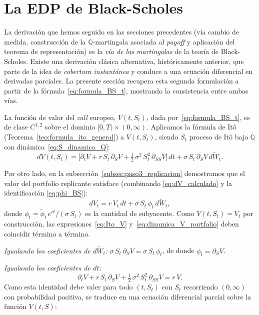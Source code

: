 \documentclass[11pt,a4paper,oneside]{report}
\theoremstyle{plain}
\theoremstyle{definition}
\theoremstyle{remark}
\newcommand{\Q}{\mathbb{Q}}
\newcommand{\1}{\mathbf{1}}
\begin{document}
\section{La EDP de Black-Scholes}
\label{sec:edp_bs}

La derivación que hemos seguido en las secciones precedentes (vía
cambio de medida, construcción de la $\Q$-martingala asociada al
\emph{payoff} y aplicación del teorema de representación) es la \emph{vía
de las martingalas} de la teoría de Black-Scholes. Existe una
derivación clásica alternativa, históricamente anterior, que parte de
la idea de \emph{cobertura instantánea} y conduce a una ecuación
diferencial en derivadas parciales. La presente sección recupera esta segunda
formulación a partir de la fórmula~\eqref{eq:formula_BS_t}, mostrando
la consistencia entre ambas vías.

La función
de valor del \emph{call} europeo, $V(t, S_t)$, dada
por~\eqref{eq:formula_BS_t}, es de clase $C^{1,2}$ sobre el dominio
$[0, T) \times (0, \infty)$. Aplicamos la fórmula de Itô
(Teorema~\ref{teo:formula_ito_general}) a $V(t, S_t)$, siendo $S_t$
proceso de Itô bajo $\Q$ con dinámica~\eqref{eq:S_dinamica_Q}:
\begin{equation}\label{eq:Ito_V}
  dV(t, S_t)
  = \biggl[\partial_t V + r\, S_t\, \partial_S V
           + \tfrac{1}{2}\, \sigma^2\, S_t^2\, \partial_{SS} V\biggr]\, dt
   + \sigma\, S_t\, \partial_S V\, d\widetilde W_t.
\end{equation}

Por otro lado, en la subsección~\ref{subsec:paso3_replicacion}
demostramos que el valor del portfolio replicante satisface
(combinando \eqref{eq:dV_calculado} y la identificación
\eqref{eq:phi_BS}):
\begin{equation}\label{eq:dinamica_V_portfolio}
  dV_t = r\, V_t\, dt + \sigma\, S_t\, \phi_t\, d\widetilde W_t,
\end{equation}
donde $\phi_t = \widetilde\phi_t\, e^{rt} / (\sigma\, S_t)$ es la
cantidad de subyacente. Como $V(t, S_t) = V_t$ por construcción, las
expresiones~\eqref{eq:Ito_V} y~\eqref{eq:dinamica_V_portfolio} deben
coincidir término a término.

\emph{Igualando los coeficientes de $d\widetilde W_t$:}
$\sigma\, S_t\, \partial_S V = \sigma\, S_t\, \phi_t$, de donde
$\phi_t = \partial_S V$.

\emph{Igualando los coeficientes de $dt$:}
\begin{equation*}
  \partial_t V + r\, S_t\, \partial_S V
  + \tfrac{1}{2}\, \sigma^2\, S_t^2\, \partial_{SS} V
  = r\, V.
\end{equation*}
Como esta identidad debe valer para todo $(t, S_t)$ con $S_t$
recorriendo $(0, \infty)$ con probabilidad positiva, se traduce en una
ecuación diferencial parcial sobre la función $V(t, S)$:
\end{document}
